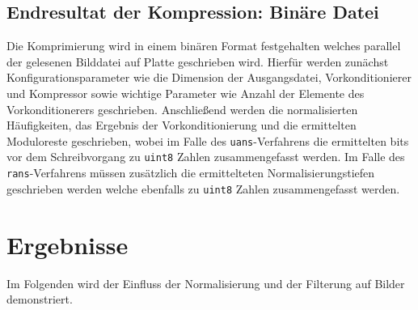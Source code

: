 \documentclass[a4paper,12pt]{article}
\begin{document}
\subsection{Endresultat der Kompression: Binäre Datei}
Die Komprimierung wird in einem binären Format festgehalten welches parallel der gelesenen Bilddatei auf Platte geschrieben wird. Hierfür werden zunächst Konfigurationsparameter wie die Dimension der Ausgangsdatei, Vorkonditionierer und Kompressor sowie wichtige Parameter wie Anzahl der Elemente des Vorkonditionerers geschrieben. Anschließend werden die normalisierten Häufigkeiten, das Ergebnis der Vorkonditionierung und die ermittelten Moduloreste geschrieben, wobei im Falle des {\tt{uans}}-Verfahrens die ermittelten bits vor dem Schreibvorgang zu {\tt{uint8}} Zahlen zusammengefasst werden. 
Im Falle des {\tt{rans}}-Verfahrens müssen zusätzlich die ermittelteten Normalisierungstiefen geschrieben werden welche ebenfalls zu {\tt{uint8}} Zahlen zusammengefasst werden.
\newpage
\section{Ergebnisse}
Im Folgenden wird der Einfluss der Normalisierung und der Filterung auf Bilder demonstriert.
\end{document}
